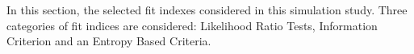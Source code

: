  In this section,  the selected fit indexes considered in this simulation study. Three categories of fit indices are considered: Likelihood Ratio Tests, Information Criterion and an Entropy Based Criteria. 
 
